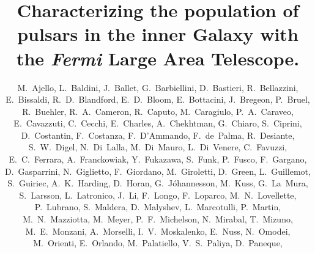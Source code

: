 \documentclass[iop]{emulateapj}
\begin{document}
%
\title{Characterizing the population of pulsars in the
  inner Galaxy with the  {\it Fermi} Large Area Telescope.}

\author{
M.~Ajello, 
L.~Baldini, 
J.~Ballet, 
G.~Barbiellini, 
D.~Bastieri, 
R.~Bellazzini, 
E.~Bissaldi, 
R.~D.~Blandford, 
E.~D.~Bloom, 
E.~Bottacini, 
J.~Bregeon, 
P.~Bruel, 
R.~Buehler, 
R.~A.~Cameron, 
R.~Caputo, 
M.~Caragiulo, 
P.~A.~Caraveo, 
E.~Cavazzuti, 
C.~Cecchi, 
E.~Charles, 
A.~Chekhtman, 
G.~Chiaro, 
S.~Ciprini, 
D.~Costantin, 
F.~Costanza, 
F.~D'Ammando, 
F.~de~Palma, 
R.~Desiante, 
S.~W.~Digel, 
N.~Di~Lalla, 
M.~Di~Mauro, 
L.~Di~Venere, 
C.~Favuzzi, 
E.~C.~Ferrara, 
A.~Franckowiak, 
Y.~Fukazawa, 
S.~Funk, 
P.~Fusco, 
F.~Gargano, 
D.~Gasparrini, 
N.~Giglietto, 
F.~Giordano, 
M.~Giroletti, 
D.~Green, 
L.~Guillemot, 
S.~Guiriec, 
A.~K.~Harding, 
D.~Horan, 
G.~J\'ohannesson, 
M.~Kuss, 
G.~La~Mura, 
S.~Larsson, 
L.~Latronico, 
J.~Li, 
F.~Longo, 
F.~Loparco, 
M.~N.~Lovellette, 
P.~Lubrano, 
S.~Maldera, 
D.~Malyshev, 
L.~Marcotulli, 
P.~Martin, 
M.~N.~Mazziotta, 
M.~Meyer, 
P.~F.~Michelson, 
N.~Mirabal, 
T.~Mizuno, 
M.~E.~Monzani, 
A.~Morselli, 
I.~V.~Moskalenko, 
E.~Nuss, 
N.~Omodei, 
M.~Orienti, 
E.~Orlando, 
M.~Palatiello, 
V.~S.~Paliya, 
D.~Paneque, 
}
\end{document}
